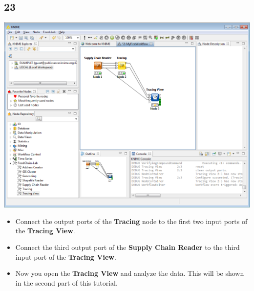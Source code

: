 \documentclass{beamer}
\begin{document}
\subsection{23}
\begin{frame}
	\begin{center}
  		\includegraphics[height=0.6\textheight]{23.png}
	\end{center}
	\begin{itemize}
		\item Connect the output ports of the \textbf{Tracing} node to the first two input ports of the \textbf{Tracing View}.
		\item Connect the third output port of the \textbf{Supply Chain Reader} to the third input port of the \textbf{Tracing View}.
		\item Now you open the \textbf{Tracing View} and analyze the data. This will be shown in the second part of this tutorial.
	\end{itemize}
\end{frame}
\end{document}
